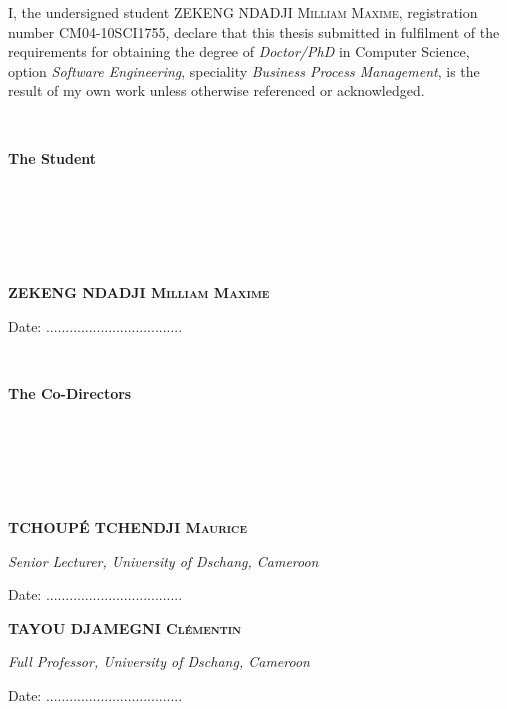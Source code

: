 
I, the undersigned student \textsc{ZEKENG NDADJI Milliam Maxime}, registration number CM04-10SCI1755, declare that this thesis submitted in fulfilment of the requirements for obtaining the degree of \textit{Doctor/PhD} in Computer Science, option \textit{Software Engineering}, speciality \textit{Business Process Management}, is the result of my own work unless otherwise referenced or acknowledged.

~

\begin{center}
	\textbf{The Student}
	
	~
	
	~
	
	~
	
	\textbf{\textsc{ZEKENG NDADJI Milliam Maxime}}
	
	Date: ...................................
\end{center}

~

\begin{center}
	\textbf{The Co-Directors}
\end{center}

~

~

~

\hspace{-7mm}
\parbox[c]{.5\textwidth}{
		\begin{center}
			\textbf{\textsc{TCHOUP\'E TCHENDJI Maurice}}
			
			\textit{Senior Lecturer, University of Dschang, Cameroon}
			
			Date: ...................................
		\end{center}
}
\parbox[c]{.5\textwidth}{
		\begin{center}
			\textbf{\textsc{TAYOU DJAMEGNI Cl\'ementin}}
			
			\textit{Full Professor, University of Dschang, Cameroon}
			
			Date: ...................................
		\end{center}
}




